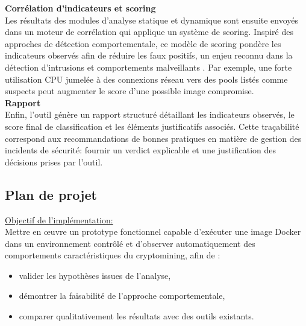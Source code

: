 \newline
\textbf{Corrélation d'indicateurs et scoring} \\
\newline
Les résultats des modules d'analyse statique et dynamique sont ensuite envoyés dans un moteur de corrélation qui applique un système de scoring. Inspiré des approches de détection comportementale, ce modèle de scoring pondère les indicateurs observés afin de réduire les faux positifs, un enjeu reconnu dans la détection d'intrusions et comportements malveillants \cite{bufalino2025orca}. Par exemple, une forte utilisation CPU jumelée à des connexions réseau vers des pools listés comme suspects peut augmenter le score d'une possible image compromise. \\
\newline
\textbf{Rapport} \\
\newline
Enfin, l'outil génère un rapport structuré détaillant les indicateurs observés, le score final de classification et les éléments justificatifs associés. Cette traçabilité correspond aux recommandations de bonnes pratiques en matière de gestion des incidents de sécurité: fournir un verdict explicable et une justification des décisions prises par l'outil.

\subsection{Plan de projet}
\underline{Objectif de l'implémentation:} \\
Mettre en œuvre un prototype fonctionnel capable d'exécuter une image Docker dans un environnement contrôlé et d'observer automatiquement des comportements caractéristiques du cryptomining, afin de :
\begin{itemize}
    \item valider les hypothèses issues de l'analyse,
    \item démontrer la faisabilité de l'approche comportementale,
    \item comparer qualitativement les résultats avec des outils existants.
\end{itemize}


